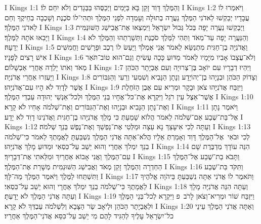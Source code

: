 I Kings 1:1	וְהַמֶּלֶךְ דָּוִד זָקֵן בָּא בַּיָּמִים וַיְכַסֻּהוּ בַּבְּגָדִים וְלֹא יִחַם לוֹ׃
I Kings 1:2	וַיֹּאמְרוּ לוֹ עֲבָדָיו יְבַקְשׁוּ לַאדֹנִי הַמֶּלֶךְ נַעֲרָה בְתוּלָה וְעָמְדָה לִפְנֵי הַמֶּלֶךְ וּתְהִי־לוֹ סֹכֶנֶת וְשָׁכְבָה בְחֵיקֶךָ וְחַם לַאדֹנִי הַמֶּלֶךְ׃
I Kings 1:3	וַיְבַקְשׁוּ נַעֲרָה יָפָה בְּכֹל גְּבוּל יִשְׂרָאֵל וַיִּמְצְאוּ אֶת־אֲבִישַׁג הַשּׁוּנַמִּית וַיָּבִאוּ אֹתָהּ לַמֶּלֶךְ׃
I Kings 1:4	וְהַנַּעֲרָה יָפָה עַד־מְאֹד וַתְּהִי לַמֶּלֶךְ סֹכֶנֶת וַתְּשָׁרְתֵהוּ וְהַמֶּלֶךְ לֹא יְדָעָהּ׃
I Kings 1:5	וַאֲדֹנִיָּה בֶן־חַגִּית מִתְנַשֵּׂא לֵאמֹר אֲנִי אֶמְלֹךְ וַיַּעַשׂ לוֹ רֶכֶב וּפָרָשִׁים וַחֲמִשִּׁים אִישׁ רָצִים לְפָנָיו׃
I Kings 1:6	וְלֹא־עֲצָבוֹ אָבִיו מִיָּמָיו לֵאמֹר מַדּוּעַ כָּכָה עָשִׂיתָ וְגַם־הוּא טוֹב־תֹּאַר מְאֹד וְאֹתוֹ יָלְדָה אַחֲרֵי אַבְשָׁלוֹם׃
I Kings 1:7	וַיִּהְיוּ דְבָרָיו עִם יוֹאָב בֶּן־צְרוּיָה וְעִם אֶבְיָתָר הַכֹּהֵן וַיַּעְזְרוּ אַחֲרֵי אֲדֹנִיָּה׃
I Kings 1:8	וְצָדוֹק הַכֹּהֵן וּבְנָיָהוּ בֶן־יְהוֹיָדָע וְנָתָן הַנָּבִיא וְשִׁמְעִי וְרֵעִי וְהַגִּבּוֹרִים אֲשֶׁר לְדָוִד לֹא הָיוּ עִם־אֲדֹנִיָּהוּ׃
I Kings 1:9	וַיִּזְבַּח אֲדֹנִיָּהוּ צֹאן וּבָקָר וּמְרִיא עִם אֶבֶן הַזֹּחֶלֶת אֲשֶׁר־אֵצֶל עֵין רֹגֵל וַיִּקְרָא אֶת־כּל־אֶחָיו בְּנֵי הַמֶּלֶךְ וּלְכל־אַנְשֵׁי יְהוּדָה עַבְדֵי הַמֶּלֶךְ׃
I Kings 1:10	וְאֶת־נָתָן הַנָּבִיא וּבְנָיָהוּ וְאֶת־הַגִּבּוֹרִים וְאֶת־שְׁלֹמֹה אָחִיו לֹא קָרָא׃
I Kings 1:11	וַיֹּאמֶר נָתָן אֶל־בַּת־שֶׁבַע אֵם־שְׁלֹמֹה לֵאמֹר הֲלוֹא שָׁמַעַתְּ כִּי מָלַךְ אֲדֹנִיָּהוּ בֶן־חַגִּית וַאֲדֹנֵינוּ דָוִד לֹא יָדָע׃
I Kings 1:12	וְעַתָּה לְכִי אִיעָצֵךְ נָא עֵצָה וּמַלְּטִי אֶת־נַפְשֵׁךְ וְאֶת־נֶפֶשׁ בְּנֵךְ שְׁלֹמֹה׃
I Kings 1:13	לְכִי וּבֹאִי  אֶל־הַמֶּלֶךְ דָּוִד וְאָמַרְתְּ אֵלָיו הֲלֹא־אַתָּה אֲדֹנִי הַמֶּלֶךְ נִשְׁבַּעְתָּ לַאֲמָתְךָ לֵאמֹר כִּי־שְׁלֹמֹה בְנֵךְ יִמְלֹךְ אַחֲרַי וְהוּא יֵשֵׁב עַל־כִּסְאִי וּמַדּוּעַ מָלַךְ אֲדֹנִיָּהוּ׃
I Kings 1:14	הִנֵּה עוֹדָךְ מְדַבֶּרֶת שָׁם עִם־הַמֶּלֶךְ וַאֲנִי אָבוֹא אַחֲרַיִךְ וּמִלֵּאתִי אֶת־דְּבָרָיִךְ׃
I Kings 1:15	וַתָּבֹא בַת־שֶׁבַע אֶל־הַמֶּלֶךְ הַחַדְרָה וְהַמֶּלֶךְ זָקֵן מְאֹד וַאֲבִישַׁג הַשּׁוּנַמִּית מְשָׁרַת אֶת־הַמֶּלֶךְ׃
I Kings 1:16	וַתִּקֹּד בַּת־שֶׁבַע וַתִּשְׁתַּחוּ לַמֶּלֶךְ וַיֹּאמֶר הַמֶּלֶךְ מַה־לָּךְ׃
I Kings 1:17	וַתֹּאמֶר לוֹ אֲדֹנִי אַתָּה נִשְׁבַּעְתָּ בַּיהֹוָה אֱלֹהֶיךָ לַאֲמָתֶךָ כִּי־שְׁלֹמֹה בְנֵךְ יִמְלֹךְ אַחֲרָי וְהוּא יֵשֵׁב עַל־כִּסְאִי׃
I Kings 1:18	וְעַתָּה הִנֵּה אֲדֹנִיָּה מָלָךְ וְעַתָּה אֲדֹנִי הַמֶּלֶךְ לֹא יָדָעְתָּ׃
I Kings 1:19	וַיִּזְבַּח שׁוֹר וּמְרִיא־וְצֹאן לָרֹב {פ} וַיִּקְרָא לְכל־בְּנֵי הַמֶּלֶךְ וּלְאֶבְיָתָר הַכֹּהֵן וּלְיֹאָב שַׂר הַצָּבָא וְלִשְׁלֹמֹה עַבְדְּךָ לֹא קָרָא׃
I Kings 1:20	וְאַתָּה אֲדֹנִי הַמֶּלֶךְ עֵינֵי כל־יִשְׂרָאֵל עָלֶיךָ לְהַגִּיד לָהֶם מִי יֵשֵׁב עַל־כִּסֵּא אֲדֹנִי־הַמֶּלֶךְ אַחֲרָיו׃
